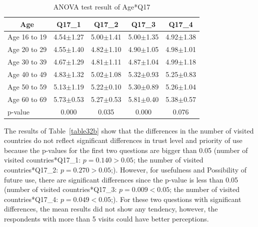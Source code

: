 \begin{table}[h]
  \caption{ANOVA test result of Age*Q17}
  \label{table32a}
  \centering
  \begin{tabular}{l|cccc}
 \hline
        \multicolumn{1}{c|}{Age}          & Q17\_1               & Q17\_2 & Q17\_3    & Q17\_4      \\
\hline
Age 16 to 19 & 4.54$\pm$1.27                    & 5.00$\pm$1.41                    & 5.00$\pm$1.35                    & 4.92$\pm$1.38                    \\
Age 20 to 29 & 4.55$\pm$1.40                    & 4.82$\pm$1.10                    & 4.90$\pm$1.05                    & 4.98$\pm$1.01                    \\
Age 30 to 39 & 4.67$\pm$1.29                    & 4.81$\pm$1.11                    & 4.87$\pm$1.04                    & 4.99$\pm$1.18                    \\
Age 40 to 49 & 4.83$\pm$1.32                    & 5.02$\pm$1.08                    & 5.32$\pm$0.93                    & 5.25$\pm$0.83                    \\
Age 50 to 59 & 5.13$\pm$1.19                    & 5.22$\pm$0.10                    & 5.30$\pm$0.89                    & 5.26$\pm$1.04                    \\
Age 60 to 69 & 5.73$\pm$0.53                    & 5.27$\pm$0.53                    & 5.81$\pm$0.40                    & 5.38$\pm$0.57                    \\
\hline
p-value&           0.000&         0.035&         0.000&   0.076     \\
 \hline
  \end{tabular}
\end{table}



The results of Table~\ref{table32b} show that the differences in the number of visited countries do not reflect significant differences in trust level and priority of use because the p-values for the first two questions are bigger than 0.05 (number of visited countries*Q17\_1: $p=0.140>0.05$; the number of visited countries*Q17\_2: $p=0.270>0.05$;). However, for usefulness and Possibility of future use, there are significant differences since the p-value is less than 0.05 (number of visited countries*Q17\_3: $p=0.009<0.05$; the number of visited countries*Q17\_4: $p=0.049<0.05$;). For these two questions with significant differences, the mean results did not show any tendency, however, the respondents with more than 5 visits could have better perceptions. 


